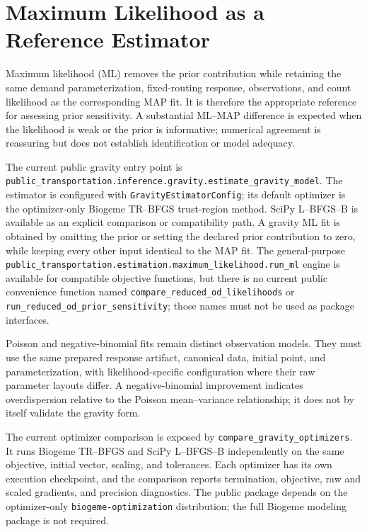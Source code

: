 
\section{Maximum Likelihood as a Reference Estimator}

Maximum likelihood (ML) removes the prior contribution while retaining the
same demand parameterization, fixed-routing response, observations, and count
likelihood as the corresponding MAP fit.  It is therefore the appropriate
reference for assessing prior sensitivity.  A substantial ML--MAP difference
is expected when the likelihood is weak or the prior is informative; numerical
agreement is reassuring but does not establish identification or model
adequacy.

The current public gravity entry point is
\texttt{public\_transportation.inference.gravity.estimate\_gravity\_model}.
The estimator is configured with \texttt{GravityEstimatorConfig}; its default
optimizer is the optimizer-only Biogeme TR--BFGS trust-region method.  SciPy
L--BFGS--B is available as an explicit comparison or compatibility path.  A
gravity ML fit is obtained by omitting the
prior or setting the declared prior contribution to zero, while keeping every
other input identical to the MAP fit.  The general-purpose
\texttt{public\_transportation.estimation.maximum\_likelihood.run\_ml} engine
is available for compatible objective functions, but there is no current
public convenience function named
\texttt{compare\_reduced\_od\_likelihoods} or
\texttt{run\_reduced\_od\_prior\_sensitivity}; those names must not be used
as package interfaces.

Poisson and negative-binomial fits remain distinct observation models.  They
must use the same prepared response artifact, canonical data, initial point,
and parameterization, with likelihood-specific configuration where their raw
parameter layouts differ.  A negative-binomial improvement indicates
overdispersion relative to the Poisson mean--variance relationship; it does
not by itself validate the gravity form.

The current optimizer comparison is exposed by
\texttt{compare\_gravity\_optimizers}.  It runs Biogeme TR--BFGS and SciPy
L--BFGS--B independently on the same objective, initial vector, scaling, and
tolerances.  Each optimizer has its own execution checkpoint, and the
comparison reports termination, objective, raw and scaled gradients, and
precision diagnostics.  The public package depends on the optimizer-only
\texttt{biogeme-optimization} distribution; the full Biogeme modeling package
is not required.


